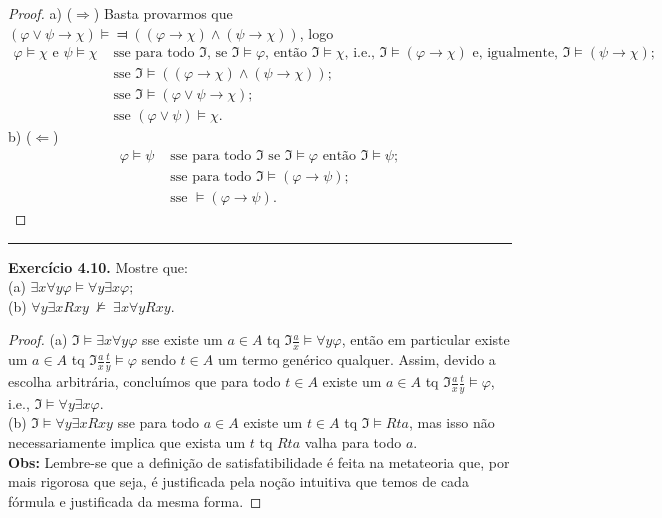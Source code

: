 \documentclass[11pt]{article}
\newcommand{\mf}[1]{\mathfrak{#1}}
\begin{document}
\begin{proof}
    a) ($\Rightarrow$) Basta provarmos que $(\varphi\vee\psi\rightarrow\chi)\vDash\Dashv((\varphi\rightarrow\chi)\wedge(\psi\rightarrow\chi))$, logo
    \begin{align*}
        \varphi\vDash\chi\text{ e }\psi\vDash\chi &\text{ sse para todo }\mf{I}\text{, se }\mf{I}\vDash\varphi\text{, então }\mf{I}\vDash\chi\text{, i.e., }\mf{I}\vDash(\varphi\rightarrow\chi)\text{ e, igualmente, }\mf{I}\vDash(\psi\rightarrow\chi);\\
        &\text{ sse }\mf{I}\vDash((\varphi\rightarrow\chi)\wedge(\psi\rightarrow\chi));\\
        &\text{ sse }\mf{I}\vDash(\varphi\vee\psi\rightarrow\chi);\\
        &\text{ sse }(\varphi\vee\psi)\vDash\chi.
    \end{align*}
    b) ($\Leftarrow$)
    \begin{align*}
        \varphi\vDash\psi & \text{ sse para todo }\mf{I}\text{ se }\mf{I}\vDash\varphi\text{ então }\mf{I}\vDash\psi;\\
        & \text{ sse para todo }\mf{I}\vDash(\varphi\to\psi);\\
        & \text{ sse }\vDash(\varphi\to\psi).
    \end{align*}
\end{proof}

\hrule

\begin{shaded}
\textbf{Exercício 4.10.}
Mostre que:\\
(a) $\exists x\forall y\varphi\vDash\forall y\exists x\varphi;$\\
(b) $\forall y\exists xRxy~\nvDash~\exists x\forall yRxy$.
\end{shaded}

\begin{proof}
    (a) $\mf{I}\vDash\exists x\forall y\varphi$ sse existe um $a\in A$ tq $\mf{I}\frac{a}{x}\vDash\forall y\varphi$, então em particular existe um $a\in A$ tq $\mf{I}\frac{a}{x}\frac{t}{y}\vDash\varphi$ sendo $t\in A$ um termo genérico qualquer. Assim, devido a escolha arbitrária, concluímos que para todo $t\in A$ existe um $a\in A$ tq $\mf{I}\frac{a}{x}\frac{t}{y}\vDash\varphi$, i.e., $\mf{I}\vDash\forall y\exists x\varphi$.\\
    (b) $\mf{I}\vDash\forall y\exists xRxy$ sse para todo $a\in A$ existe um $t\in A$ tq $\mf{I}\vDash Rta$, mas isso não necessariamente implica que exista um $t$ tq $Rta$ valha para todo $a$.\\
    \textbf{Obs:} Lembre-se que a definição de satisfatibilidade é feita na metateoria que, por mais rigorosa que seja, é justificada pela noção intuitiva que temos de cada fórmula e justificada da mesma forma.
\end{proof}
\end{document}
